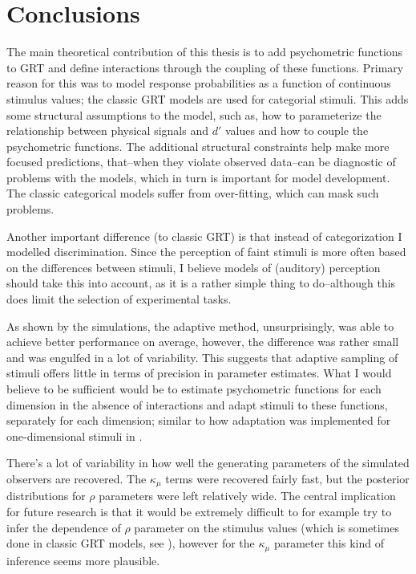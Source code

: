 \documentclass{article}\usepackage{knitr}
\begin{document}
\newpage


\section{Conclusions}

The main theoretical contribution of this thesis is to add psychometric functions to GRT and define interactions through the coupling of these functions. Primary reason for this was to model response probabilities as a function of continuous stimulus values; the classic GRT models are used for categorial stimuli. This adds some structural assumptions to the model, such as, how to parameterize the relationship between physical signals and $d'$ values and how to couple the psychometric functions. The additional structural constraints help make more focused predictions, that--when they violate observed data--can be diagnostic of problems with the models, which in turn is important for model development. The classic categorical models suffer from over-fitting, which can mask such problems.

Another important difference (to classic GRT) is that instead of categorization I modelled discrimination. Since the perception of faint stimuli is more often based on the differences between stimuli, I believe models of (auditory) perception should take this into account, as it is a rather simple thing to do--although this does limit the selection of experimental tasks.  

As shown by  the simulations,  the adaptive method, unsurprisingly, was able to achieve better performance on average, however, the difference was rather small and was engulfed in a lot of variability. This suggests that adaptive sampling of stimuli offers little in terms of precision in parameter estimates. What I would believe to be sufficient would be to estimate psychometric functions for each dimension in the absence of interactions and adapt stimuli to these functions, separately for each dimension; similar to how adaptation was implemented for one-dimensional stimuli in \citet{kontsevichtyler1999}. 

There's a lot of variability in how well the generating parameters of the simulated observers are recovered. The $\kappa_{\mu}$ terms were recovered fairly fast, but the posterior distributions for $\rho$ parameters were left relatively wide. The central implication for future research is that it would be extremely difficult to for example try to infer the dependence of $\rho$ parameter on the stimulus values (which is sometimes done in classic GRT  models, see \citet{ashby2015, soto2017}), however for the $\kappa_{\mu}$ parameter this kind of inference seems more plausible.  
 
\end{document}
